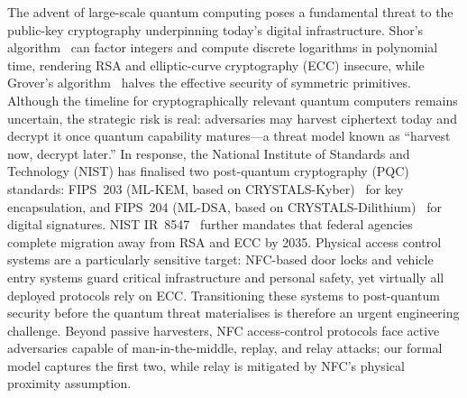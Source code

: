 \documentclass[runningheads]{llncs}
\begin{document}
The advent of large-scale quantum computing poses a fundamental threat to the public-key cryptography underpinning today's digital infrastructure. Shor's algorithm~\cite{SIAM:Shor97} can factor integers and compute discrete logarithms in polynomial time, rendering RSA and elliptic-curve cryptography (ECC) insecure, while Grover's algorithm~\cite{STOC:Grover96} halves the effective security of symmetric primitives. Although the timeline for cryptographically relevant quantum computers remains uncertain, the strategic risk is real: adversaries may harvest ciphertext today and decrypt it once quantum capability matures---a threat model known as ``harvest now, decrypt later.'' In response, the National Institute of Standards and Technology (NIST) has finalised two post-quantum cryptography (PQC) standards: FIPS~203 (ML-KEM, based on CRYSTALS-Kyber)~\cite{NIST:FIPS203} for key encapsulation, and FIPS~204 (ML-DSA, based on CRYSTALS-Dilithium)~\cite{NIST:FIPS204} for digital signatures. NIST IR~8547~\cite{NIST:IR8547} further mandates that federal agencies complete migration away from RSA and ECC by 2035. Physical access control systems are a particularly sensitive target: NFC-based door locks and vehicle entry systems guard critical infrastructure and personal safety, yet virtually all deployed protocols rely on ECC. Transitioning these systems to post-quantum security before the quantum threat materialises is therefore an urgent engineering challenge. Beyond passive harvesters, NFC access-control protocols face active adversaries capable of man-in-the-middle, replay, and relay attacks; our formal model captures the first two, while relay is mitigated by NFC's physical proximity assumption.
\end{document}
